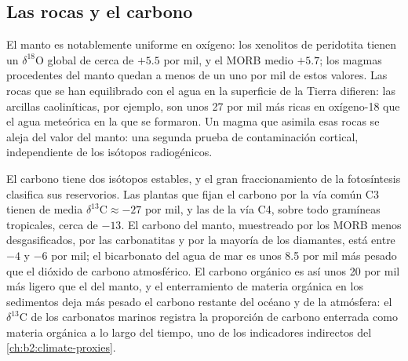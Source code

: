 \subsection{Las rocas y el carbono}

El manto es notablemente uniforme en oxígeno: los xenolitos de peridotita tienen un
$\delta^{18}\mathrm{O}$ global de cerca de $+5.5$ por mil, y el MORB medio $+5.7$; los magmas
procedentes del manto quedan a menos de un uno por mil de estos valores. Las rocas que se han
equilibrado con el agua en la superficie de la Tierra difieren: las arcillas caoliníticas, por
ejemplo, son unos 27 por mil más ricas en oxígeno-18 que el agua meteórica en la que
se formaron. Un magma que asimila esas rocas se aleja del valor del
manto: una segunda prueba de contaminación cortical, independiente de los isótopos
radiogénicos.

El carbono tiene dos isótopos estables, y el gran fraccionamiento de la fotosíntesis
clasifica sus reservorios. Las plantas que fijan el carbono por la vía común C3 tienen de media
$\delta^{13}\mathrm{C} \approx -27$ por mil, y las de la vía C4, sobre todo gramíneas
tropicales, cerca de $-13$. El carbono del manto, muestreado por los MORB menos desgasificados,
por las carbonatitas y por la mayoría de los diamantes, está entre $-4$ y $-6$ por mil; el
bicarbonato del agua de mar es unos 8.5 por mil más pesado que el dióxido de carbono
atmosférico. El carbono orgánico es así unos 20 por mil más ligero que el del manto, y
el enterramiento de materia orgánica en los sedimentos deja más pesado el carbono restante del
océano y de la atmósfera: el $\delta^{13}\mathrm{C}$ de los carbonatos marinos
registra la proporción de carbono enterrada como materia orgánica a lo largo del tiempo, uno de los
indicadores indirectos del \cref{ch:b2:climate-proxies}.

\begin{omfigure}
\centering
{}
\par{}
\end{omfigure}

